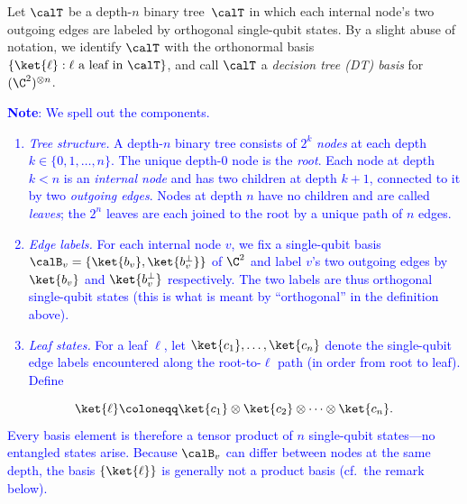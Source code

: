 \begin{definition}
    Let $\calT$ be a depth-$n$ binary tree~$\calT$ in which each internal node's two outgoing edges are labeled by orthogonal single-qubit states. 
    By a slight abuse of notation, we identify $\calT$ with the orthonormal basis $\{\ket{\ell} : \ell \text{ a leaf in } \calT\}$, and call $\calT$ a \emph{decision tree (DT) basis} for $(\C^2)^{\otimes n}$.

    \textcolor{blue}{\textbf{Note}: We spell out the components.
    \begin{enumerate}
        \item \emph{Tree structure.} A depth-$n$ binary tree consists of $2^k$ \emph{nodes} at each depth $k \in \{0, 1, \ldots, n\}$. The unique depth-$0$ node is the \emph{root}. Each node at depth $k < n$ is an \emph{internal node} and has two children at depth $k+1$, connected to it by two \emph{outgoing edges}. Nodes at depth $n$ have no children and are called \emph{leaves}; the $2^n$ leaves are each joined to the root by a unique path of $n$ edges.
        \item \emph{Edge labels.} For each internal node $v$, we fix a single-qubit basis $\calB_v = \{\ket{b_v}, \ket{b_v^\bot}\}$ of $\C^2$ and label $v$'s two outgoing edges by $\ket{b_v}$ and $\ket{b_v^\bot}$ respectively. The two labels are thus orthogonal single-qubit states (this is what is meant by ``orthogonal'' in the definition above).
        \item \emph{Leaf states.} For a leaf $\ell$, let $\ket{c_1}, \ldots, \ket{c_n}$ denote the single-qubit edge labels encountered along the root-to-$\ell$ path (in order from root to leaf). Define
    \end{enumerate}
    \[
        \ket{\ell} \coloneqq \ket{c_1} \otimes \ket{c_2} \otimes \cdots \otimes \ket{c_n}.
    \]
    Every basis element is therefore a tensor product of $n$ single-qubit states---no entangled states arise. Because $\calB_v$ can differ between nodes at the same depth, the basis $\{\ket{\ell}\}$ is generally not a product basis (cf.\ the remark below).
    }
\end{definition}
